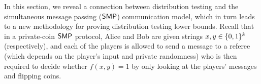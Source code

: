 
In this section, we reveal a connection between distribution testing and the simultaneous message passing ($\mathsf{SMP}$) communication model, which in turn leads to a new methodology for proving distribution testing lower bounds. Recall that in a private-coin $\mathsf{SMP}$ protocol, Alice and Bob are given strings $x,y \in \{0,1\}^k$ (respectively), and each of the players is allowed to send a message to a referee (which depends on the player's input and private randomness) who is then required to decide whether $f(x,y)=1$ by only looking at the players' messages and flipping coins.

